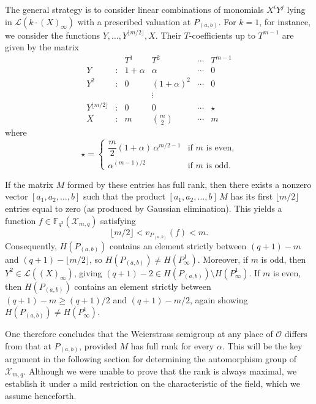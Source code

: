 \documentclass[12pt]{amsart}
\theoremstyle{remark}
\theoremstyle{definition}
\begin{document}
The general strategy is to consider linear combinations of monomials 
$X^i Y^j$ lying in $\mathcal{L}(k \cdot (X)_\infty)$ with a prescribed 
valuation at $P_{(a,b)}$. For $k = 1$, for instance, we consider the 
functions $Y, \ldots, Y^{\lfloor m/2 \rfloor}, X$. Their $T$-coefficients 
up to $T^{m-1}$ are given by the matrix
\begin{equation}\label{matrix}
\begin{array}{cccccc}
      &   & T^1 & T^2 & \cdots & T^{m-1} \\[4pt]
    Y & : & 1 + \alpha & \alpha & \cdots & 0 \\
    Y^2 & : & 0 & (1 + \alpha)^2 & \cdots & 0 \\
    & & & \vdots & & \\
    Y^{\lfloor m/2 \rfloor} & : & 0 & 0 & \cdots & \star \\
    X & : & m & \binom{m}{2} & \cdots & m
\end{array}
\end{equation}
where
\[
\star = \begin{cases}
    \dfrac{m}{2}(1 + \alpha)\,\alpha^{m/2 - 1} & \text{if } m \text{ is even,} \\[6pt]
    \alpha^{(m-1)/2} & \text{if } m \text{ is odd.}
\end{cases}
\]

If the matrix $M$ formed by these entries has full rank, then there exists 
a nonzero vector $[a_1, a_2, \ldots, b]$ such that the product 
$[a_1, a_2, \ldots, b]\, M$ has its first $\lfloor m/2 \rfloor$ entries 
equal to zero (as produced by Gaussian elimination). This yields a function 
$f \in \mathbb{F}_{q^2}(\mathcal{X}_{m,q})$ satisfying
\[
    \lfloor m/2 \rfloor < v_{P_{(a,b)}}(f) < m.
\]
Consequently, $H(P_{(a,b)})$ contains an element strictly between 
$(q+1) - m$ and $(q+1) - \lfloor m/2 \rfloor$, so 
$H(P_{(a,b)}) \neq H(P_\infty^1)$. Moreover, if $m$ is odd, then 
$Y^2 \in \mathcal{L}((X)_\infty)$, giving 
$(q+1) - 2 \in H(P_{(a,b)}) \setminus H(P_\infty^1)$. If $m$ is even, 
then $H(P_{(a,b)})$ contains an element strictly between 
$(q+1) - m \ge (q+1)/2$ and $(q+1) - m/2$, again showing 
$H(P_{(a,b)}) \neq H(P_\infty^1)$.

One therefore concludes that the Weierstrass semigroup at any place of 
$\mathcal{O}$ differs from that at $P_{(a,b)}$, provided $M$ has full rank 
for every $\alpha$. This will be the key argument in the following section 
for determining the automorphism group of $\mathcal{X}_{m,q}$. Although we 
were unable to prove that the rank is always maximal, we establish it under 
a mild restriction on the characteristic of the field, which we assume 
henceforth.
\end{document}
